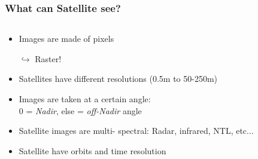 \documentclass[xcolor=x11names,compress]{beamer}
\renewcommand{\(}{\begin{columns}}
\renewcommand{\)}{\end{columns}}
\newcommand{\<}[1]{\begin{column}{#1}}
\renewcommand{\>}{\end{column}}
\begin{document}
\begin{frame}
    \frametitle{What can  Satellite see? }
    \begin{columns}[T]
        \begin{column}{0.7\textwidth}
            \begin{itemize}[<+->]
             \item Images are made of pixels
             \item[$\hookrightarrow$] Raster!
             \item Satellites have different resolutions (0.5m to  50-250m)
             \item Images are taken at a certain angle:\\ 0 = \emph{Nadir}, else = \emph{off-Nadir} angle
             \item Satellite images are multi- spectral: Radar, infrared, NTL, etc...
             \item Satellite have orbits and time resolution
            \end{itemize}
        \end{column}
        \begin{column}{0.3\textwidth}
         \begin{itemize}
             \item[]

\end{itemize}
\end{column}
\end{columns}
\end{frame}
\end{document}

